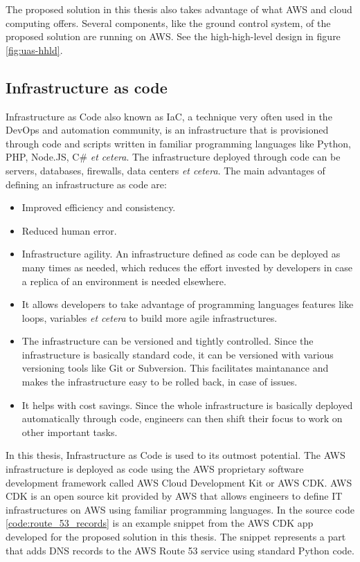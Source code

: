 The proposed solution in this thesis also takes advantage of what AWS and cloud computing offers. Several components, like the ground control system, of the proposed solution are running on AWS. See the high-high-level design in figure \ref{fig:uas-hhld}.

\subsection{Infrastructure as code}
Infrastructure as Code also known as IaC, a technique very often used in the DevOps and automation community, is an infrastructure that is provisioned through code and scripts written in familiar programming languages like Python, PHP, Node.JS, C\# \textit{et cetera}. The infrastructure deployed through code can be servers, databases, firewalls, data centers \textit{et cetera}. The main advantages of defining an infrastructure as code are:

\begin{itemize}
    \item Improved efficiency and consistency.
    \item Reduced human error.
    \item Infrastructure agility. An infrastructure defined as code can be deployed as many times as needed, which reduces the effort invested by developers in case a replica of an environment is needed elsewhere.
    \item It allows developers to take advantage of programming languages features like loops, variables \textit{et cetera} to build more agile infrastructures.
    \item The infrastructure can be versioned and tightly controlled. Since the infrastructure is basically standard code, it can be versioned with various versioning tools like Git or Subversion. This facilitates maintanance and makes the infrastructure easy to be rolled back, in case of issues.
    \item It helps with cost savings. Since the whole infrastructure is basically deployed automatically through code, engineers can then shift their focus to work on other important tasks.
\end{itemize}

In this thesis, Infrastructure as Code is used to its outmost potential. The AWS infrastructure is deployed as code using the AWS proprietary software development framework called AWS Cloud Development Kit or AWS CDK. AWS CDK is an open source kit provided by AWS that allows engineers to define IT infrastructures on AWS using familiar programming languages. In the source code \ref{code:route_53_records} is an example snippet from the AWS CDK app developed for the proposed solution in this thesis. The snippet represents a part that adds DNS records to the AWS Route 53 service using standard Python code.


